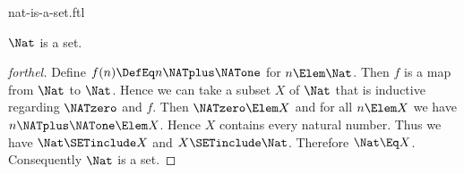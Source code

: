 \documentclass{stex}
\begin{document}
\begin{smodule}{nat-is-a-set.ftl}

\begin{proposition}[forthel]
  $\Nat$ is a set.
\end{proposition}
\begin{proof}[forthel]
  Define $f(n) \DefEq n \NATplus \NATone$ for $n \Elem \Nat$.
  Then $f$ is a map from $\Nat$ to $\Nat$.
  Hence we can take a subset $X$ of $\Nat$ that is inductive regarding
  $\NATzero$ and $f$.
  Then $\NATzero \Elem X$ and for all $n \Elem X$ we have $n \NATplus \NATone \Elem X$.
  Hence $X$ contains every natural number.
  Thus we have $\Nat \SETinclude X$ and $X \SETinclude \Nat$.
  Therefore $\Nat \Eq X$.
  Consequently $\Nat$ is a set.
\end{proof}
\end{smodule}
\end{document}
